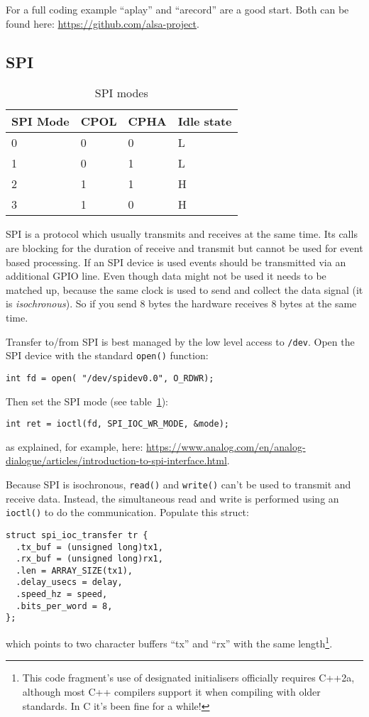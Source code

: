 \documentclass[12pt]{report}
\begin{document}
For a full coding example ``aplay'' and ``arecord'' are a good start.
Both can be found here:
\url{https://github.com/alsa-project}.






\subsection{SPI}
\begin{table}[!ht]
  \begin{center}
  \caption{SPI modes\label{spimodes}}
  \begin{tabular}{l|l|l|l}
    SPI Mode & 	CPOL & 	CPHA & Idle state \\
    \hline
    0& 	0&	0& 	L \\
    1& 	0&	1& 	L \\
    2& 	1&	1& 	H \\
    3& 	1&	0& 	H \\
  \end{tabular}
  \end{center}
\end{table}
SPI is a protocol which usually transmits and receives at the same
time. Its calls are blocking for the duration of receive and transmit but cannot be used for
event based processing. If an SPI device is used events should be transmitted via an additional
GPIO line. 
Even though data might not be used it needs to be matched up,
because the same clock is used to send and collect the data signal
(it is \emph{isochronous}).
So if you send 8 bytes the hardware receives 8 bytes at the same time.

Transfer to/from SPI is best managed by the low level access to \texttt{/dev}.
Open the SPI device with the standard \texttt{open()} function:
\begin{verbatim}
int fd = open( "/dev/spidev0.0", O_RDWR);
\end{verbatim}

Then set the SPI mode (see table~\ref{spimodes}):
\begin{verbatim}
int ret = ioctl(fd, SPI_IOC_WR_MODE, &mode);
\end{verbatim}
as explained, for example, here:
\url{https://www.analog.com/en/analog-dialogue/articles/introduction-to-spi-interface.html}.

Because SPI is isochronous, \texttt{read()} and \texttt{write()}
can't be used to transmit and receive data. Instead, the simultaneous
read and write is performed using an \texttt{ioctl()} to do the communication.
Populate this struct:
\begin{verbatim}
struct spi_ioc_transfer tr {
  .tx_buf = (unsigned long)tx1,
  .rx_buf = (unsigned long)rx1,
  .len = ARRAY_SIZE(tx1),
  .delay_usecs = delay,
  .speed_hz = speed,
  .bits_per_word = 8,
};
\end{verbatim}
which points to two character buffers ``tx'' and ``rx'' with the
same length\footnote{This code fragment's use of designated initialisers
officially requires C++2a, although most C++ compilers support it
when compiling with older standards. In C it's been fine for a while!}.
\end{document}
